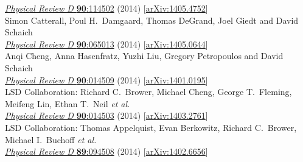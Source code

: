 \begin{spacelist}
\begin{revnumerate}
      \href{https://doi.org/10.1103/PhysRevD.90.114502}{\textit{Physical Review D} \textbf{90}:114502} (2014) [\href{http://arxiv.org/abs/1405.4752}{arXiv:1405.4752}]
    \pagebreakitem
       \\
      Simon Catterall, Poul H.~Damgaard, Thomas DeGrand, Joel Giedt and David Schaich \\
      \href{https://doi.org/10.1103/PhysRevD.90.065013}{\textit{Physical Review D} \textbf{90}:065013} (2014) [\href{http://arxiv.org/abs/1405.0644}{arXiv:1405.0644}]
    \pagebreakitem
       \\
      Anqi Cheng, Anna Hasenfratz, Yuzhi Liu, Gregory Petropoulos and David Schaich \\
      \href{https://doi.org/10.1103/PhysRevD.90.014509}{\textit{Physical Review D} \textbf{90}:014509} (2014) [\href{http://arxiv.org/abs/1401.0195}{arXiv:1401.0195}]
    \pagebreakitem
       \\
      LSD Collaboration: Richard C.~Brower, Michael Cheng, George T.~Fleming, Meifeng Lin, Ethan T.~Neil \textit{et al.} \\ %
      \href{https://doi.org/10.1103/PhysRevD.90.014503}{\textit{Physical Review D} \textbf{90}:014503} (2014) [\href{http://arxiv.org/abs/1403.2761}{arXiv:1403.2761}]%
    \pagebreakitem
       \\
      LSD Collaboration: Thomas Appelquist, Evan Berkowitz, Richard C.~Brower, Michael I.~Buchoff \textit{et al.} \\ %
      \href{https://doi.org/10.1103/PhysRevD.89.094508}{\textit{Physical Review D} \textbf{89}:094508} (2014) [\href{http://arxiv.org/abs/1402.6656}{arXiv:1402.6656}]
    \pagebreakitem
       \\

\end{revnumerate}
\end{spacelist}
